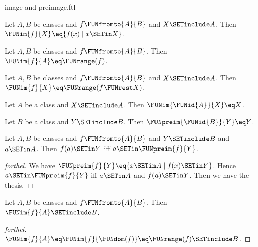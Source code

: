 \documentclass{naproche-library}
\begin{document}
\begin{smodule}[title=Computation Laws for Images and Preimages]{image-and-preimage.ftl}

\begin{proposition}[forthel,id=FOUNDATIONS_07_5919649206108160]
  Let $A, B$ be classes and $f \FUNfromto{A}{B}$ and $X \SETinclude A$.
  Then $\FUNim{f}{X} \eq \{ f(x) \mid x \SETin X \}$.
\end{proposition}

\begin{corollary}[forthel,id=FOUNDATIONS_07_5543924730953728]
  Let $A, B$ be classes and $f \FUNfromto{A}{B}$.
  Then $\FUNim{f}{A} \eq \FUNrange(f)$.
\end{corollary}

\begin{corollary}[forthel,id=FOUNDATIONS_07_1818812171157504]
  Let $A, B$ be classes and $f \FUNfromto{A}{B}$ and $X \SETinclude A$.
  Then $\FUNim{f}{X} \eq \FUNrange(f \FUNrest X)$.
\end{corollary}

\begin{proposition}[forthel,id=FOUNDATIONS_07_911395830890496]
  Let $A$ be a class and $X \SETinclude A$.
  Then $\FUNim{\FUNid{A}}{X} \eq X$.
\end{proposition}

\begin{proposition}[forthel,id=FOUNDATIONS_07_3349817830932480]
  Let $B$ be a class and $Y \SETinclude B$.
  Then $\FUNpreim{\FUNid{B}}{Y} \eq Y$.
\end{proposition}

\begin{proposition}[forthel,id=FOUNDATIONS_07_6362984433582080]
  Let $A, B$ be classes and $f \FUNfromto{A}{B}$ and $Y \SETinclude B$ and $a \SETin A$.
  Then $f(a) \SETin Y$ iff $a \SETin \FUNpreim{f}{Y}$.
\end{proposition}
\begin{proof}[forthel]
  We have $\FUNpreim{f}{Y} \eq \{ x \SETin A \mid f(x) \SETin Y \}$.
  Hence $a \SETin \FUNpreim{f}{Y}$ iff $a \SETin A$ and $f(a) \SETin Y$.
  Then we have the thesis.
\end{proof}

\begin{proposition}[forthel,id=FOUNDATIONS_07_6730546254184448]
  Let $A, B$ be classes and $f \FUNfromto{A}{B}$.
  Then $\FUNim{f}{A} \SETinclude B$.
\end{proposition}
\begin{proof}[forthel]
  $\FUNim{f}{A}
    \eq \FUNim{f}{\FUNdom(f)}
    \eq \FUNrange(f)
    \SETinclude B$.
\end{proof}


\end{smodule}
\end{document}
